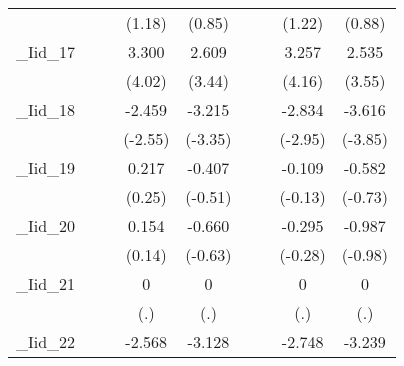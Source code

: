 {\begin{tabular}{l*{8}{c}}
            &                     &                     &      (1.18)         &      (0.85)         &                     &                     &      (1.22)         &      (0.88)         \\
[1em]
\_Iid\_17     &                     &                     &       3.300\sym{***}&       2.609\sym{***}&                     &                     &       3.257\sym{***}&       2.535\sym{***}\\
            &                     &                     &      (4.02)         &      (3.44)         &                     &                     &      (4.16)         &      (3.55)         \\
[1em]
\_Iid\_18     &                     &                     &      -2.459\sym{*}  &      -3.215\sym{***}&                     &                     &      -2.834\sym{**} &      -3.616\sym{***}\\
            &                     &                     &     (-2.55)         &     (-3.35)         &                     &                     &     (-2.95)         &     (-3.85)         \\
[1em]
\_Iid\_19     &                     &                     &       0.217         &      -0.407         &                     &                     &      -0.109         &      -0.582         \\
            &                     &                     &      (0.25)         &     (-0.51)         &                     &                     &     (-0.13)         &     (-0.73)         \\
[1em]
\_Iid\_20     &                     &                     &       0.154         &      -0.660         &                     &                     &      -0.295         &      -0.987         \\
            &                     &                     &      (0.14)         &     (-0.63)         &                     &                     &     (-0.28)         &     (-0.98)         \\
[1em]
\_Iid\_21     &                     &                     &           0         &           0         &                     &                     &           0         &           0         \\
            &                     &                     &         (.)         &         (.)         &                     &                     &         (.)         &         (.)         \\
[1em]
\_Iid\_22     &                     &                     &      -2.568\sym{**} &      -3.128\sym{**} &                     &                     &      -2.748\sym{***}&      -3.239\sym{***}\\

\end{tabular}}
